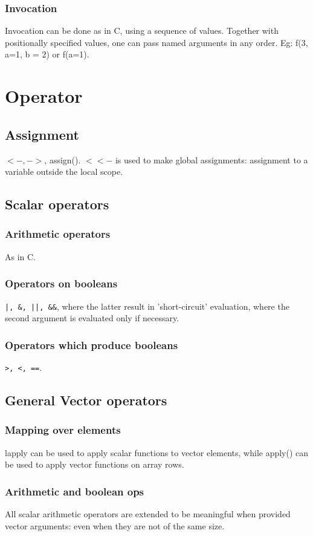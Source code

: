 \subsubsection{Invocation}
Invocation can be done as in C, using a sequence of values. Together with positionally specified values, one can pass named arguments in any order. Eg: f(3, a=1, b = 2) or f(a=1).

\section{Operator}
\subsection{Assignment}
$<-, ->$, assign(). $<<-$ is used to make global assignments: assignment to a variable outside the local scope.

\subsection{Scalar operators}
\subsubsection{Arithmetic operators}
As in C.

\subsubsection{Operators on booleans}
\verb'|, &, ||, &&',  where the latter result in 'short-circuit' evaluation, where the second argument is evaluated only if necessary.

\subsubsection{Operators which produce booleans}
\verb'>, <, =='.

\subsection{General Vector operators}
\subsubsection{Mapping over elements}
lapply can be used to apply scalar functions to vector elements, while apply() can be used to apply vector functions on array rows.

\subsubsection{Arithmetic and boolean ops}
All scalar arithmetic operators are extended to be meaningful when provided vector arguments: even when they are not of the same size.

